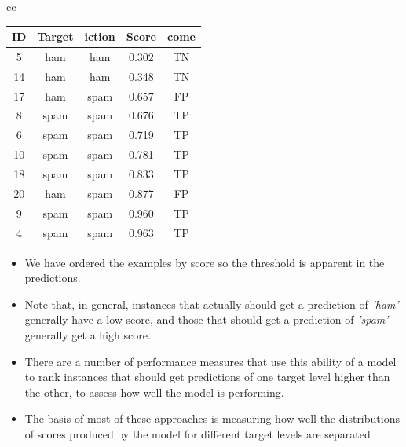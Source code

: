 \documentclass[xcolor={table}]{beamer}
\newcommand{\featN}[1]{\textsc{#1}}
\newcommand{\featL}[1]{\textit{'#1'}}
\begin{document}
\begin{frame}
\begin{table}[htb]
\begin{tiny}
\begin{tabular}{cc}
\begin{minipage}{0.45\textwidth}
\begin{tabular}{  c  c  c  c  c }
\featN{ID}	 & Target	& iction & Score & come\\
\hline
5	&	ham	&	ham	&	0.302	&	TN	\\
14	&	ham	&	ham	&	0.348	&	TN	\\
17	&	ham	&	spam	&	0.657	&	FP	\\
8	&	spam	&	spam	&	0.676	&	TP	\\
6	&	spam	&	spam	&	0.719	&	TP	\\
10	&	spam	&	spam	&	0.781	&	TP	\\
18	&	spam	&	spam	&	0.833	&	TP	\\
20	&	ham	&	spam	&	0.877	&	FP	\\
9	&	spam	&	spam	&	0.960	&	TP	\\
4	&	spam	&	spam	&	0.963	&	TP	\\
\hline 
\end{tabular}
			\end{minipage}
\end{tabular}
\end{tiny}
\end{table}
\end{frame} 

\begin{frame}
	\begin{itemize}
		\item We have ordered the examples by score so the threshold is apparent in the predictions.
		\item Note that, in general, instances that actually should get a prediction of \featL{ham} generally have a low score, and those that should get a prediction of \featL{spam} generally get a high score.
	\end{itemize}
\end{frame}

\begin{frame}
	\begin{itemize}
		\item There are a number of performance measures that use this ability of a model to rank instances that should get predictions of one target level higher than the other, to assess how well the model is performing.
		\item The basis of most of these approaches is measuring \alert{how well the distributions of scores produced by the model for different target levels are separated}
	\end{itemize}
\end{frame}
\end{document}

